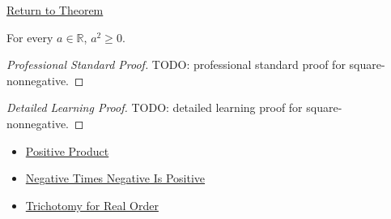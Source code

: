 \newpage
{}
\label{prf:square-nonnegative}

\begin{remark*}[Return]
\hyperref[thm:square-nonnegative]{Return to Theorem}
\end{remark*}

\begin{theorem*}
For every $a\in\mathbb{R}$, $a^2\ge0$.
\end{theorem*}

\begin{proof}[Professional Standard Proof]
\LRAProofBodyStart
TODO: professional standard proof for square-nonnegative.
\end{proof}

\begin{proof}[Detailed Learning Proof]
\LRAProofBodyStart
TODO: detailed learning proof for square-nonnegative.
\end{proof}

\begin{remark*}
\end{remark*}

\begin{dependencies}
\begin{itemize}
  \item \hyperref[lem:positive-product]{Positive Product}
  \item \hyperref[lem:negative-times-negative-is-positive]{Negative Times Negative Is Positive}
  \item \hyperref[thm:real-order-trichotomy]{Trichotomy for Real Order}
\end{itemize}
\end{dependencies}

\clearpage

